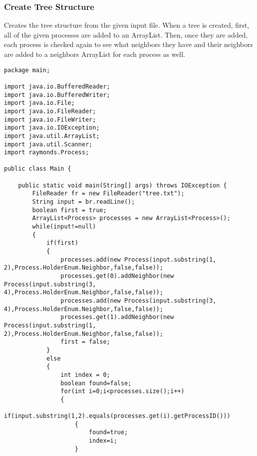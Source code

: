 \documentclass{article}
\begin{document}
		\subsubsection{Create Tree Structure}
		Creates the tree structure from the given input file. When a tree is created,  first,  all of the given processes are added to an ArrayList. Then, once they are added, each process is checked again to see what neighbors they have and their neighbors are added to a neighbors ArrayList for each process as well.
		\begin{lstlisting}
package main;

import java.io.BufferedReader;
import java.io.BufferedWriter;
import java.io.File;
import java.io.FileReader;
import java.io.FileWriter;
import java.io.IOException;
import java.util.ArrayList;
import java.util.Scanner;
import raymonds.Process;

public class Main {

	public static void main(String[] args) throws IOException {
		FileReader fr = new FileReader("tree.txt");
		String input = br.readLine();
		boolean first = true;
		ArrayList<Process> processes = new ArrayList<Process>();
		while(input!=null)
		{
			if(first)
			{
				processes.add(new Process(input.substring(1, 2),Process.HolderEnum.Neighbor,false,false));
				processes.get(0).addNeighbor(new Process(input.substring(3, 4),Process.HolderEnum.Neighbor,false,false));
				processes.add(new Process(input.substring(3, 4),Process.HolderEnum.Neighbor,false,false));
				processes.get(1).addNeighbor(new Process(input.substring(1, 2),Process.HolderEnum.Neighbor,false,false));
				first = false;
			}
			else
			{
				int index = 0;
				boolean found=false;
				for(int i=0;i<processes.size();i++)
				{
					if(input.substring(1,2).equals(processes.get(i).getProcessID()))
					{
						found=true;
						index=i;
					}
					

\end{lstlisting}
\end{document}
